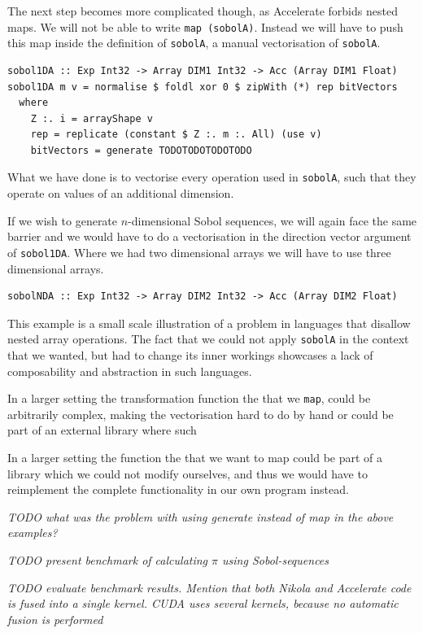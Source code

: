\documentclass{llncs2e/llncs}
\begin{document}
The next step becomes more complicated though, as Accelerate forbids
nested maps. We will not be able to write \verb|map (sobolA)|.
Instead we will have to push this map inside the definition of
\verb|sobolA|, a manual vectorisation of \verb|sobolA|.
\begin{verbatim}
sobol1DA :: Exp Int32 -> Array DIM1 Int32 -> Acc (Array DIM1 Float)
sobol1DA m v = normalise $ foldl xor 0 $ zipWith (*) rep bitVectors
  where
    Z :. i = arrayShape v
    rep = replicate (constant $ Z :. m :. All) (use v)
    bitVectors = generate TODOTODOTODOTODO
\end{verbatim}
What we have done is to vectorise every operation used in
\verb|sobolA|, such that they operate on values of an additional
dimension.

If we wish to generate $n$-dimensional Sobol sequences, we will again
face the same barrier and we would have to do a vectorisation in the
direction vector argument of \verb|sobol1DA|. Where we had two
dimensional arrays we will have to use three dimensional arrays. %

\begin{verbatim}
sobolNDA :: Exp Int32 -> Array DIM2 Int32 -> Acc (Array DIM2 Float)
\end{verbatim}

This example is a small scale illustration of a problem in languages
that disallow nested array operations. The fact that we could not
apply \verb|sobolA| in the context that we wanted, but had to change
its inner workings showcases a lack of composability and abstraction
in such languages. 

In a larger setting the transformation function the that we
\verb|map|, could be arbitrarily complex, making the vectorisation
hard to do by hand or could be part of an external library where such

In a larger setting the function the that we want to map could be part of
a library which we could not modify ourselves, and thus we would have
to reimplement the complete functionality in our own program instead.

\emph{TODO what was the problem with using generate instead of map in the
above examples?}

\emph{TODO present benchmark of calculating $\pi$ using Sobol-sequences}

\emph{TODO evaluate benchmark results. Mention that both Nikola and
  Accelerate code is fused into a single kernel. CUDA uses several
  kernels, because no automatic fusion is performed}
\end{document}
